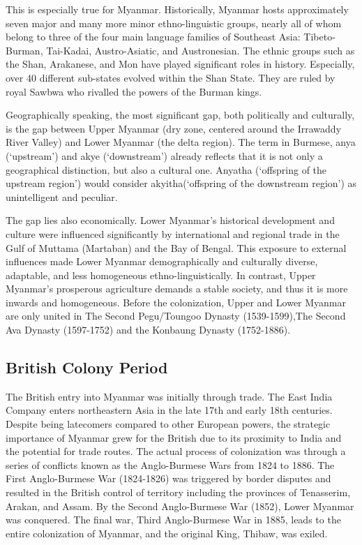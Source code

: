 \documentclass{article}
\begin{document}
This is especially true for Myanmar. Historically, Myanmar hosts approximately seven major and many more minor ethno-linguistic groups, nearly all of whom belong to three of the four main language families of Southeast Asia: Tibeto-Burman, Tai-Kadai, Austro-Asiatic, and Austronesian. The ethnic groups such as the Shan, Arakanese, and Mon have played significant roles in history. \autocite[p.46-56]{aung-thwinHistoryMyanmarAncient2012} Especially, over 40 different sub-states evolved within the Shan State. They are ruled by royal Sawbwa who rivalled the powers of the Burman kings.\autocite[18,54]{smithEthnicGroupsBurma1994} 

Geographically speaking, the most significant gap, both politically and culturally, is the gap between Upper Myanmar (dry zone, centered around the Irrawaddy River Valley) and Lower Myanmar (the delta region). The term in Burmese, anya (`upstream') and akye (`downstream') already reflects that it is not only a geographical distinction, but also a cultural one. Anyatha (`offspring of the upstream region’) would consider akyitha(`offspring of the downstream region’) as unintelligent and peculiar. \autocite[43,142]{aung-thwinHistoryMyanmarAncient2012}

The gap lies also economically. Lower Myanmar's historical development and culture were influenced significantly by international and regional trade in the Gulf of Muttama (Martaban) and the Bay of Bengal. This exposure to external influences made Lower Myanmar demographically and culturally diverse, adaptable, and less homogeneous ethno-linguistically. In contrast, Upper Myanmar's prosperous agriculture demands a stable society, and thus it is more inwards and homogeneous. Before the colonization, Upper and Lower Myanmar are only united in The Second Pegu/Toungoo Dynasty (1539-1599),The Second Ava Dynasty (1597-1752) and the Konbaung Dynasty (1752-1886).~\autocite[33,44,130]{aung-thwinHistoryMyanmarAncient2012}

\subsection{British Colony Period}

The British entry into Myanmar was initially through trade. The East India Company enters northeastern Asia in the late 17th and early 18th centuries. Despite being latecomers compared to other European powers, the strategic importance of Myanmar grew for the British due to its proximity to India and the potential for trade routes. The actual process of colonization was through a series of conflicts known as the Anglo-Burmese Wars from 1824 to 1886. The First Anglo-Burmese War (1824-1826) was triggered by border disputes and resulted in the British control of territory including the provinces of Tenasserim, Arakan, and Assam. By the Second Anglo-Burmese War (1852), Lower Myanmar was conquered. The final war, Third Anglo-Burmese War in 1885, leads to the entire colonization of Myanmar, and the original King, Thibaw, was exiled.~\autocite[174-194]{aung-thwinHistoryMyanmarAncient2012}
\end{document}
